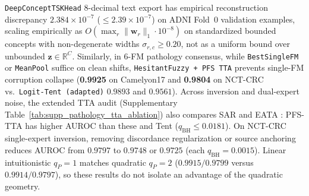 \documentclass[10pt,twocolumn]{article}
\begin{document}
\texttt{DeepConceptTSKHead} 8-decimal text export has empirical reconstruction discrepancy
$2.384 \times 10^{-7}$ ($\le2.39 \times 10^{-7}$) on ADNI Fold~0 validation examples,
scaling empirically as $O(\max_r\|\bm{w}_r\|_1\cdot10^{-8})$ on standardized bounded concepts
with non-degenerate widths $\sigma_{r,c}\ge0.20$, not as a uniform bound over unbounded
$\bm{z}\in\mathbb{R}^C$. Similarly, in 6-FM pathology consensus, while
\texttt{BestSingleFM} or \texttt{MeanPool} suffice on clean shifts, \texttt{HesitantFuzzy + PFS
TTA} prevents single-FM corruption collapse (\textbf{0.9925} on Camelyon17 and \textbf{0.9804}
on NCT-CRC vs.\ \texttt{Logit-Tent (adapted)} $0.9893$ and $0.9561$).
Across inversion and dual-expert noise, the extended TTA audit
(Supplementary Table~\ref{tab:supp_pathology_tta_ablation}) also compares SAR and EATA
\cite{niu2022eata,niu2023sar}: PFS-TTA has higher AUROC than these and Tent
($q_{\mathrm{BH}}\le0.0181$). On NCT-CRC single-expert inversion, removing discordance
regularization or source anchoring reduces AUROC from $0.9797$ to $0.9748$ or $0.9725$
(each $q_{\mathrm{BH}}=0.0015$). Linear intuitionistic $q_P=1$ matches quadratic $q_P=2$
($0.9915/0.9799$ versus $0.9914/0.9797$), so these results do not isolate an advantage of
the quadratic geometry.
\end{document}
